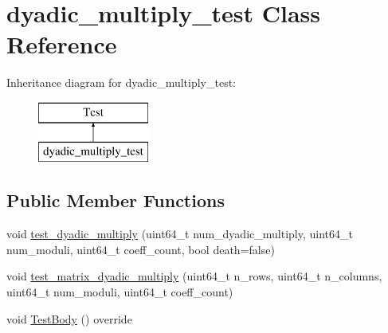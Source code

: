 \hypertarget{classdyadic__multiply__test}{\section{dyadic\-\_\-multiply\-\_\-test Class Reference}
\label{classdyadic__multiply__test}
}
Inheritance diagram for dyadic\-\_\-multiply\-\_\-test\-:\begin{figure}[H]
\begin{center}
\leavevmode
\includegraphics[height=2.000000cm]{classdyadic__multiply__test}
\end{center}
\end{figure}
\subsection*{Public Member Functions}
\begin{DoxyCompactItemize}
\item 
void \hyperlink{classdyadic__multiply__test_a30c5897858c8434401ae46efc05d53b0}{test\-\_\-dyadic\-\_\-multiply} (uint64\-\_\-t num\-\_\-dyadic\-\_\-multiply, uint64\-\_\-t num\-\_\-moduli, uint64\-\_\-t coeff\-\_\-count, bool death=false)
\item 
void \hyperlink{classdyadic__multiply__test_aed73bb19b0e21ab956ee635db8e783c3}{test\-\_\-matrix\-\_\-dyadic\-\_\-multiply} (uint64\-\_\-t n\-\_\-rows, uint64\-\_\-t n\-\_\-columns, uint64\-\_\-t num\-\_\-moduli, uint64\-\_\-t coeff\-\_\-count)
\item 
void \hyperlink{classdyadic__multiply__test_a4f423f1c9b8b1821ce865b53488708a3}{Test\-Body} () override
\end{DoxyCompactItemize}


